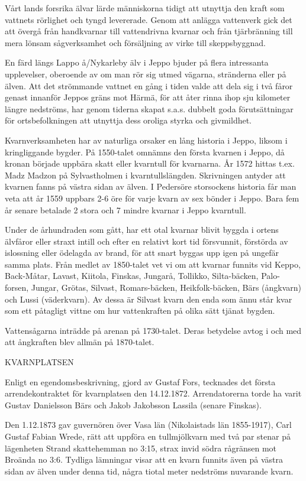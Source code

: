 Vårt lands forsrika älvar lärde människorna tidigt att utnyttja den kraft som vattnets rörlighet och tyngd levererade. Genom att anlägga vattenverk gick det att övergå från handkvarnar till vattendrivna kvarnar och från tjärbränning till mera lönsam sågverksamhet och försäljning av virke till skeppsbyggnad.

En färd längs Lappo å/Nykarleby älv i Jeppo bjuder på flera intressanta upplevelser, oberoende av om man rör sig utmed vägarna, stränderna eller på älven. Att det strömmande vattnet en gång i tiden valde att dela sig i två fåror genast innanför Jeppos gräns mot Härmä, för att åter rinna ihop sju kilometer längre nedströms, har genom tiderna skapat s.a.s. dubbelt goda förutsättningar för ortsbefolkningen att utnyttja dess oroliga styrka och givmildhet.

Kvarnverksamheten har av naturliga orsaker en lång historia i Jeppo, liksom i kringliggande bygder. På 1550-talet omnämns den första kvarnen i Jeppo, då kronan började uppbära skatt eller kvarntull för kvarnarna. År 1572 hittas t.ex. Madz Madzon på Sylvastholmen i kvarntullslängden. Skrivningen antyder att kvarnen fanns på västra sidan av älven. I Pedersöre storsockens historia får man veta att år 1559 uppbars 2-6 öre för varje kvarn av sex bönder i Jeppo. Bara fem år senare betalade 2 stora och 7 mindre kvarnar i Jeppo kvarntull.

Under de århundraden som gått, har ett otal kvarnar blivit byggda i ortens  älvfåror eller straxt intill och efter en relativt kort tid försvunnit, förstörda av islossning eller ödelagda av brand, för att snart byggas upp igen på ungefär samma plats. Från medlet av 1850-talet vet vi om att kvarnar funnits vid Keppo, Back-Måtar, Lavast, Kiitola, Finskas, Jungarå, Tollikko, Silta-bäcken, Palo-forsen, Jungar, Grötas, Silvast, Romars-bäcken, Heikfolk-bäcken, Bärs (ångkvarn) och Lussi (väderkvarn). Av dessa är Silvast kvarn den enda som ännu står kvar som ett påtagligt vittne om hur vattenkraften på olika sätt tjänat bygden.

Vattensågarna inträdde på arenan på 1730-talet. Deras betydelse avtog i och med att ångkraften blev allmän på 1870-talet.


KVARNPLATSEN

Enligt en egendomsbeskrivning, gjord av Gustaf Fors, tecknades det första arrendekontraktet för kvarnplatsen den 14.12.1872. Arrendatorerna torde ha varit Gustav Danielsson Bärs och Jakob Jakobsson Lassila (senare Finskas).

Den 1.12.1873 gav guvernören över Vasa län (Nikolaistads län 1855-1917), Carl Gustaf Fabian Wrede, rätt att uppföra en tullmjölkvarn med två par stenar på lägenheten Strand skattehemman no 3:15, strax invid södra rågränsen mot Broända no 3:6. Tydliga lämningar visar att en kvarn funnits även på västra sidan av älven under denna tid, några tiotal meter nedströms nuvarande kvarn.


